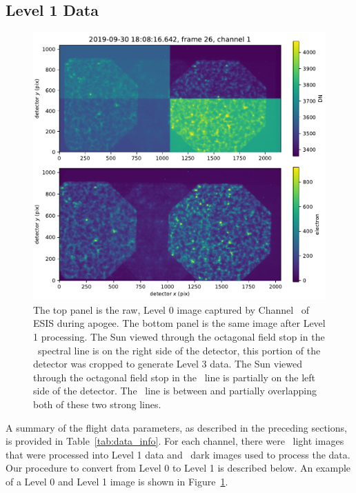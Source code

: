 \documentclass[linenumbers,trackchanges]{aastex63}
\begin{document}
\subsection{Level 1 Data}
	    \begin{figure}
	    	\centering
	    	\includegraphics{L0_to_L1}
	    	\caption{The top panel is the raw, Level 0 image captured by Channel \ of ESIS during apogee. The bottom panel is the same image after Level 1 processing. The Sun viewed through the octagonal field stop in the \ov \ spectral line is on the right side of the detector, this portion of the detector was cropped to generate Level 3 data.  The Sun viewed through the octagonal field stop in the \hei \ line is partially on the left side of the detector. The \mgxbright \ line is between and partially overlapping both of these two strong lines.}
	    	\label{fig:L0_to_L1}
	    \end{figure}
    	
A summary of the flight data parameters, as described in the preceding sections, is provided in Table~\ref{tab:data_info}. 
For each channel, there were \numDataFrames\ light images that were processed into Level 1 data and \numDarkFrames\ dark images used to process the data.
Our procedure to convert from Level 0 to Level 1 is described below. An example of a Level 0 and Level 1 image is shown in Figure~\ref{fig:L0_to_L1}.
\end{document}
